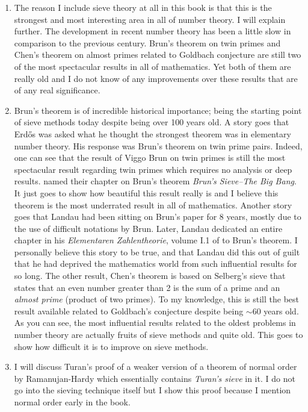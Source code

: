 \documentclass[12pt,leqno,]{book}
\theoremstyle{definition}
\theoremstyle{definition}
\begin{document}
\begin{enumerate}[(1)]
			\item The reason I include sieve theory at all in this book is that this is the strongest and most interesting area in all of number theory. I will explain further. The development in recent number theory has been a little slow in comparison to the previous century. Brun's theorem on twin primes and Chen's theorem on almost primes related to Goldbach conjecture are still two of the most spectacular results in all of mathematics. Yet both of them are really old and I do not know of any improvements over these results that are of any real significance. \item Brun's theorem is of incredible historical importance; being the starting point of sieve methods today despite being over 100 years old. A story goes that Erd\H{o}s was asked what he thought the strongest theorem was in elementary number theory. His response was Brun's theorem on twin prime pairs. Indeed, one can see that the result of Viggo Brun on twin primes is still the most spectacular result regarding twin primes which requires no analysis or deep results. \textcite[Chapter VI]{friedlander_iwaniec_2010} named their chapter on Brun's theorem \textit{Brun’s Sieve--The Big Bang}. It just goes to show how beautiful this result really is and I believe this theorem is the most underrated result in all of mathematics. Another story goes that Landau had been sitting on Brun's paper for 8 years, mostly due to the use of difficult notations by Brun. Later, Landau dedicated an entire chapter in his \textit{Elementaren Zahlentheorie}, volume I.1 of \textcite{landau_1927} to Brun's theorem. I personally believe this story to be true, and that Landau did this out of guilt that he had deprived the mathematics world from such influential results for so long. The other result, Chen's theorem is based on Selberg's sieve that states that an even number greater than 2 is the sum of a prime and an \textit{almost prime} (product of two primes). To my knowledge, this is still the best result available related to Goldbach's conjecture despite being $\sim$60 years old. As you can see, the most influential results related to the oldest problems in number theory are actually fruits of sieve methods and quite old. This goes to show how difficult it is to improve on sieve methods.
			\item I will discuss Turan's proof of a weaker version of a theorem of normal order by Ramanujan-Hardy which essentially contains \textit{Turan's sieve} in it. I do not go into the sieving technique itself but I show this proof because I mention normal order early in the book.

\end{enumerate}
\end{document}
